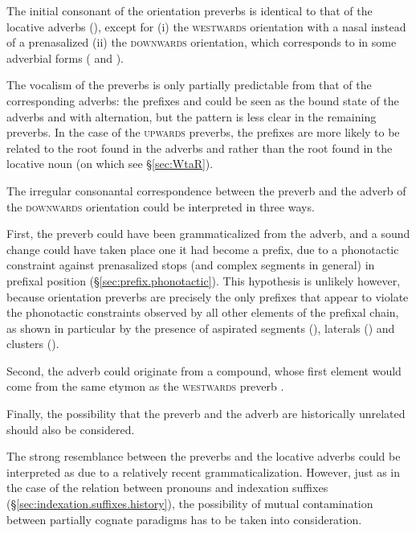 The initial consonant of the orientation preverbs is identical to that of the locative adverbs (), except for (i) the \textsc{westwards} orientation with a nasal  instead of a prenasalized  (ii) the \textsc{downwards} orientation, which corresponds to  in some adverbial forms ( and ). 

The vocalism of the preverbs is only partially predictable from that of the corresponding adverbs: the prefixes  and  could be seen as the bound state of the adverbs  and  with  \fl{}  alternation, but the pattern is less clear in the remaining preverbs. In the case of the \textsc{upwards} preverbs, the  prefixes are more likely to be related to the  root found in the adverbs  and  rather than the  root found in the locative noun  (on which see §\ref{sec:WtaR}).

 The irregular consonantal correspondence between the preverb  and the adverb   of the \textsc{downwards} orientation could be interpreted in three ways. 
 
 First, the preverb could have been grammaticalized from the adverb, and a sound change  \fl{}  could have taken place one it had become a prefix, due to a phonotactic constraint against prenasalized stops (and complex segments in general) in prefixal position (§\ref{sec:prefix.phonotactic}). This hypothesis is unlikely however, because orientation preverbs are precisely the only prefixes that appear to violate the phonotactic constraints observed by all other elements of the prefixal chain, as shown in particular by the presence of aspirated segments (), laterals () and clusters ().
 
Second, the adverb  could originate from a compound, whose first element  would come from the same etymon as the \textsc{westwards} preverb .

Finally, the possibility that the preverb  and the adverb  are historically unrelated should also be considered.

The strong resemblance between the preverbs and the locative adverbs could be interpreted as due to a relatively recent grammaticalization. However, just as in the case of the relation between pronouns and indexation suffixes (§\ref{sec:indexation.suffixes.history}), the possibility of mutual contamination between partially cognate paradigms has to be taken into consideration.
 
